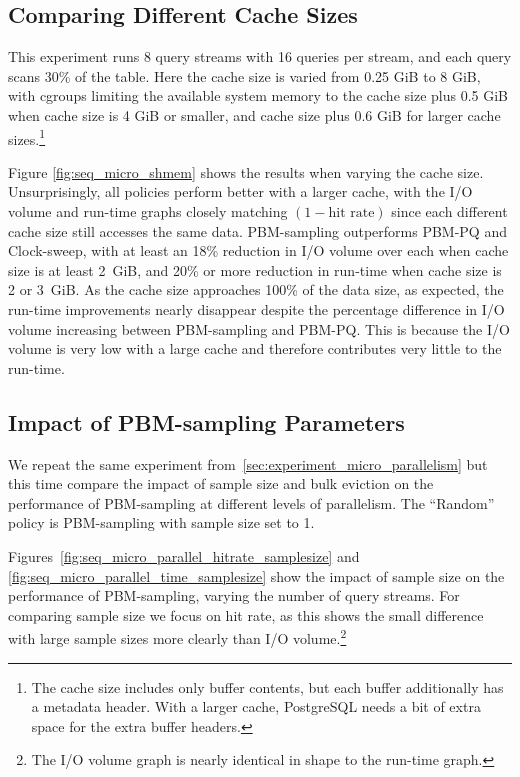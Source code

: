 \subsection{Comparing Different Cache Sizes}

This experiment runs 8 query streams with 16 queries per stream, and each query scans 30\% of the table. Here the cache size is varied from 0.25 GiB  to 8 GiB, with cgroups limiting the available system memory to the cache size plus 0.5 GiB when cache size is 4 GiB or smaller, and cache size plus 0.6 GiB for larger cache sizes.\footnote{The cache size includes only buffer contents, but each buffer additionally has a metadata header. With a larger cache, PostgreSQL needs a bit of extra space for the extra buffer headers.}

Figure \ref{fig:seq_micro_shmem} shows the results when varying the cache size.
Unsurprisingly, all policies perform better with a larger cache, with the I/O volume and run-time graphs closely matching $(1-\text{hit rate})$ since each different cache size still accesses the same data. PBM-sampling outperforms PBM-PQ and Clock-sweep, with at least an 18\% reduction in I/O volume over each when cache size is at least 2~GiB, and 20\% or more reduction in run-time when cache size is 2 or 3~GiB. As the cache size approaches 100\% of the data size, as expected, the run-time improvements nearly disappear despite the percentage difference in I/O volume increasing between PBM-sampling and PBM-PQ. This is because the I/O volume is very low with a large cache and therefore contributes very little to the run-time. 


\subsection{Impact of PBM-sampling Parameters} 

We repeat the same experiment from~\ref{sec:experiment_micro_parallelism} but this time compare the impact of sample size and bulk eviction on the performance of PBM-sampling at different levels of parallelism. The ``Random'' policy is PBM-sampling with sample size set to 1.

Figures~\ref{fig:seq_micro_parallel_hitrate_samplesize} and \ref{fig:seq_micro_parallel_time_samplesize} show the impact of sample size on the performance of PBM-sampling, varying the number of query streams. For comparing sample size we focus on hit rate, as this shows the small difference with large sample sizes more clearly than I/O volume.\footnote{The I/O volume graph is nearly identical in shape to the run-time graph.}

